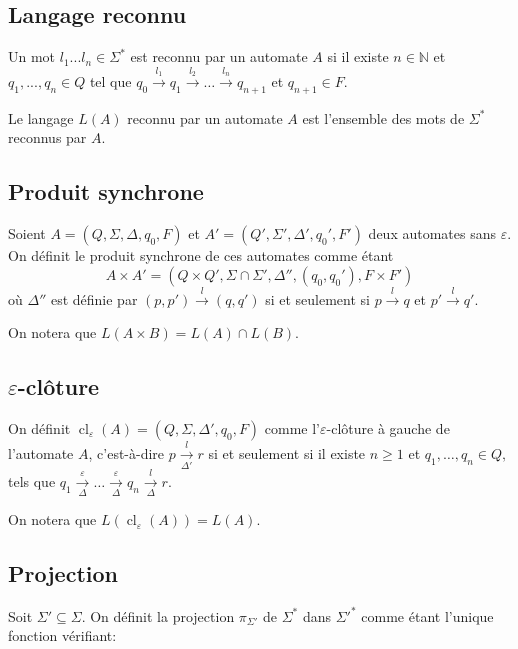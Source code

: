 \documentclass[10pt,a4paper]{article}
\begin{document}
\subsection{Langage reconnu}

Un mot $l_1...l_n \in \Sigma^*$ est reconnu par un automate $A$ si il existe $n \in \mathbb N$ et $q_1,...,q_n \in Q$ tel que $q_0 \overset{l_1}{{\to}} q_1 \overset{l_2}{{\to}} \dots \overset{l_n}{{\to}} q_{n+1}$ et $q_{n+1} \in F$.

Le langage $L(A)$ reconnu par un automate $A$ est l'ensemble des mots de $\Sigma^*$ reconnus par $A$.

\subsection{Produit synchrone}

Soient $A = (Q, \Sigma, \Delta, q_0, F)$ et $A' = (Q', \Sigma', \Delta', q_0', F')$ deux automates sans $\varepsilon$. On définit le produit synchrone de ces automates comme \'etant $$A\times A' = (Q \times Q', \Sigma \cap \Sigma', \Delta'', (q_0, q_0'), F\times F')$$ o\`u $\Delta''$ est d\'efinie par $(p,p')\overset{l}{{\to}}(q,q')$ si et seulement si $p\overset{l}{{\to}}q$ et $p'\overset{l}{{\to}}q'$.

On notera que $L(A\times B) = L(A) \cap L(B)$.

\subsection{$\varepsilon$-clôture}

On définit  $\operatorname{cl}_\varepsilon(A) = (Q, \Sigma, \Delta', q_0, F)$ comme l'$\varepsilon$-clôture \`a gauche de l'automate $A$, c'est-\`a-dire $p \underset{\Delta'}{\overset{l}{{\to}}} r$ si et seulement si il existe $n\ge 1$ et $q_1,\dots,q_n \in Q,$ tels que $q_1 \underset{\Delta}{\overset{\varepsilon}{{\to}}} \dots \underset{\Delta}{\overset{\varepsilon}{{\to}}} q_n \underset{\Delta}{\overset{l}{{\to}}} r$.

On notera que $L(\operatorname{cl}_\varepsilon(A))=L(A)$.

\subsection{Projection}

Soit $\Sigma'\subseteq \Sigma$. On d\'efinit la projection $\pi_{\Sigma'}$ de $\Sigma^*$ dans $\Sigma'^*$ comme \'etant l'unique fonction v\'erifiant:
\end{document}
